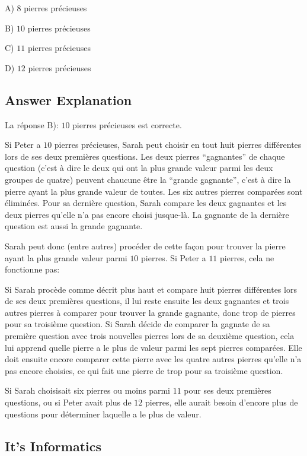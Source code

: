 \documentclass[a4paper,11pt]{report}
\begin{document}
A) $8$ pierres précieuses

B) $10$ pierres précieuses

C) $11$ pierres précieuses

D) $12$ pierres précieuses

\endgroup

\subsection*{Answer Explanation}

La réponse B): $10$ pierres précieuses est correcte.

Si Peter a $10$ pierres précieuses, Sarah peut choisir en tout huit pierres différentes lors de ses deux premières questions. Les deux pierres “gagnantes” de chaque question (c’est à dire le deux qui ont la plus grande valeur parmi les deux groupes de quatre) peuvent chaucune être la “grande gagnante”, c’est à dire la pierre ayant la plus grande valeur de toutes. Les six autres pierres comparées sont éliminées. Pour sa dernière question, Sarah compare les deux gagnantes et les deux pierres qu’elle n’a pas encore choisi jusque-là. La gagnante de la dernière question est aussi la grande gagnante.

Sarah peut donc (entre autres) procéder de cette façon pour trouver la pierre ayant la plus grande valeur parmi $10$ pierres. Si Peter a $11$ pierres, cela ne fonctionne pas:

Si Sarah procède comme décrit plus haut et compare huit pierres différentes lors de ses deux premières questions, il lui reste ensuite les deux gagnantes et trois autres pierres à comparer pour trouver la grande gagnante, donc trop de pierres pour sa troisième question. Si Sarah décide de comparer la gagnate de sa première question avec trois nouvelles pierres lors de sa deuxième question, cela lui apprend quelle pierre a le plus de valeur parmi les sept pierres comparées. Elle doit ensuite encore comparer cette pierre avec les quatre autres pierres qu’elle n’a pas encore choisies, ce qui fait une pierre de trop pour sa troisième question.

Si Sarah choisisait six pierres ou moins parmi $11$ pour ses deux premières questions, ou si Peter avait plus de $12$ pierres, elle aurait besoin d’encore plus de questions pour déterminer laquelle a le plus de valeur.


\subsection*{It’s Informatics}
\end{document}
